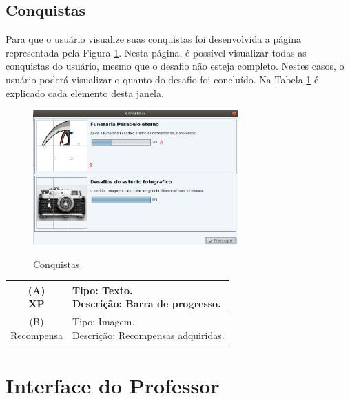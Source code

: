 \documentclass[
	12pt,				%
	oneside,			%
	a4paper,			%
	english,			%
	french,				%
	spanish,			%
	brazil,				%
	]{abntex2}
\begin{document}
\subsection{Conquistas}

Para que o usuário visualize suas conquistas foi desenvolvida a página representada pela Figura \ref{fig:visnodeConquistas}. Nesta página, é possível visualizar todas as conquistas do usuário, mesmo que o desafio não esteja completo. Nestes casos, o usuário poderá visualizar o quanto do desafio foi concluído. Na Tabela \ref{tab:listagemMissoesConcluidas} é explicado cada elemento desta janela.

\begin{figure}[H]
\centering
\caption{Conquistas}
\includegraphics[width=0.7\textwidth]{imagens/visnode_conquistas.png}
\sourceAuthor
\label{fig:visnodeConquistas}
\end{figure}

\begin{table}[H]
\centering
{} \label{tab:listagemMissoesConcluidas}
\renewcommand{\arraystretch}{1.8}
\setlength{\tabcolsep}{10pt}
\begin{tabular}{|c|l|}
  \hline
  \makecell{(A) \\ XP} 
  &
  \makecell[l]{Tipo: Texto.\\ Descrição: Barra de progresso.} \\
  \hline
  \makecell{(B) \\ Recompensa} 
  &
  \makecell[l]{Tipo: Imagem.\\ Descrição: Recompensas adquiridas.} \\
  \hline
 
\end{tabular}
\centering
\sourceAuthor
\end{table}

\section{Interface do Professor}
\end{document}

